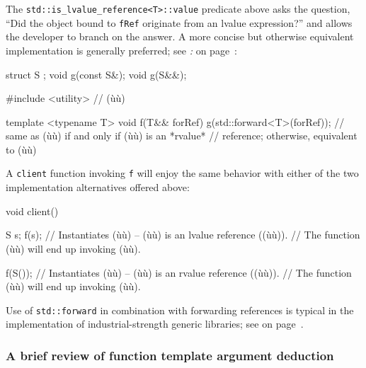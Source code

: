\noindent The \texttt{std::is\_lvalue\_reference<T>::value} predicate above asks
the question, ``Did the object bound to \texttt{fRef} originate
from an lvalue expression?'' and allows the developer to branch on the
answer. A more concise but otherwise equivalent implementation is
generally preferred; see \textit{: } on page~\pageref{the-std::forward-utility}:

\begin{emcppshiddenlisting}[emcppsbatch=e2]
struct S {};
void g(const S&);
void g(S&&);
\end{emcppshiddenlisting}
\begin{emcppslisting}[emcppsbatch=e2]
#include <utility>  // (ù{}ù)

template <typename T>
void f(T&& forRef)
{
    g(std::forward<T>(forRef));
        // same as (ù{}ù) if and only if (ù{}ù) is an *rvalue*
        // reference; otherwise, equivalent to (ù{}ù)
}
\end{emcppslisting}

\noindent A \texttt{client} function invoking \texttt{f} will enjoy the same
behavior with either of the two implementation alternatives offered
above:

\begin{emcppslisting}[emcppsbatch=e2]
void client()
{
    S s;
    f(s);    // Instantiates (ù{}ù) -- (ù{}ù) is an lvalue reference ((ù{}ù)).
             // The function (ù{}ù) will end up invoking (ù{}ù).

    f(S());  // Instantiates (ù{}ù) -- (ù{}ù) is an rvalue reference ((ù{}ù)).
             // The function (ù{}ù) will end up invoking (ù{}ù).
}
\end{emcppslisting}

\noindent Use of \texttt{std::forward} in combination with forwarding references
is typical in the implementation of industrial-strength generic
libraries; see \textit{} on page~\pageref{use-cases-forwardingref}.

\subsubsection[A brief review of function template argument deduction]{A brief review of function template argument deduction}\label{a-brief-review-of-function-template-argument-deduction}

